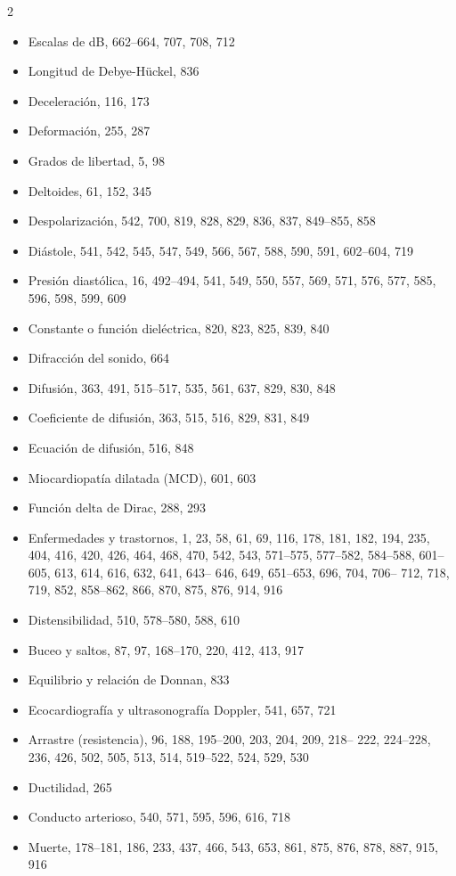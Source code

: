 \documentclass[12pt,a4paper]{book}
\begin{document}
\begin{multicols}{2}
\begin{itemize}[leftmargin=*]
  \item Escalas de dB, 662--664, 707, 708, 712
  \item Longitud de Debye-Hückel, 836
  \item Deceleración, 116, 173
  \item Deformación, 255, 287
  \item Grados de libertad, 5, 98
  \item Deltoides, 61, 152, 345
  \item Despolarización, 542, 700, 819, 828, 829, 836, 837, 849--855, 858
  \item Diástole, 541, 542, 545, 547, 549, 566, 567, 588, 590, 591, 602--604, 719
  \item Presión diastólica, 16, 492--494, 541, 549, 550, 557, 569, 571, 576, 577, 585, 596, 598, 599, 609
  \item Constante o función dieléctrica, 820, 823, 825, 839, 840
  \item Difracción del sonido, 664
  \item Difusión, 363, 491, 515--517, 535, 561, 637, 829, 830, 848
  \item Coeficiente de difusión, 363, 515, 516, 829, 831, 849
  \item Ecuación de difusión, 516, 848
  \item Miocardiopatía dilatada (MCD), 601, 603
  \item Función delta de Dirac, 288, 293
  \item Enfermedades y trastornos, 1, 23, 58, 61, 69, 116, 178, 181, 182, 194, 235, 404, 416, 420, 426, 464, 468, 470, 542, 543, 571--575, 577--582, 584--588, 601-- 605, 613, 614, 616, 632, 641, 643-- 646, 649, 651--653, 696, 704, 706-- 712, 718, 719, 852, 858--862, 866, 870, 875, 876, 914, 916
  \item Distensibilidad, 510, 578--580, 588, 610
  \item Buceo y saltos, 87, 97, 168--170, 220, 412, 413, 917
  \item Equilibrio y relación de Donnan, 833
  \item Ecocardiografía y ultrasonografía Doppler, 541, 657, 721
  \item Arrastre (resistencia), 96, 188, 195--200, 203, 204, 209, 218-- 222, 224--228, 236, 426, 502, 505, 513, 514, 519--522, 524, 529, 530
  \item Ductilidad, 265
  \item Conducto arterioso, 540, 571, 595, 596, 616, 718
  \item Muerte, 178--181, 186, 233, 437, 466, 543, 653, 861, 875, 876, 878, 887, 915, 916

\end{itemize}
\end{multicols}
\end{document}
